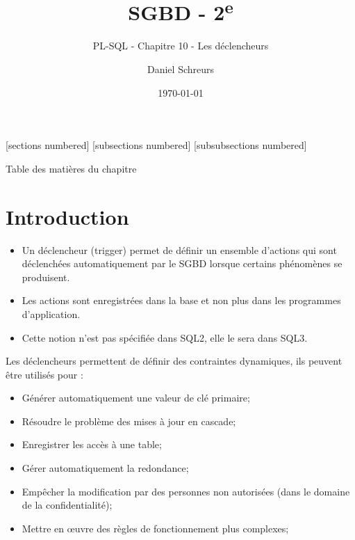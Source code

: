 \documentclass[10pt]{beamer}
\title{SGBD - 2\textsuperscript{e}}
\subtitle{PL-SQL - Chapitre 10 - Les déclencheurs}
\date{\today}
\author{Daniel Schreurs}
\institute{Haute École de la Province de Liège}
\begin{document}
\maketitle

[sections numbered]
[subsections numbered]
[subsubsections numbered]
\begin{frame}[allowframebreaks]{Table des matières du chapitre}
    \tableofcontents[subsectionstyle=show/show/hide,subsubsectionstyle=show/show/hide,]
\end{frame}

\section{Introduction}
\begin{frame}{\secname}
    \begin{itemize}
        \item Un déclencheur (trigger) permet de définir un ensemble d'actions qui sont déclenchées automatiquement par le SGBD lorsque certains phénomènes se produisent.
        \item Les actions sont enregistrées dans la base et non plus dans les programmes d'application.
        \item Cette notion n'est pas spécifiée dans SQL2, elle le sera dans SQL3.
    \end{itemize}
\end{frame}

\begin{frame}{\secname}
    Les déclencheurs permettent de définir des contraintes dynamiques, ils peuvent être utilisés pour :
    \begin{itemize}
        \item Générer automatiquement une valeur de clé primaire;
        \item Résoudre le problème des mises à jour en cascade;
        \item Enregistrer les accès à une table;
        \item Gérer automatiquement la redondance;
        \item Empêcher la modification par des personnes non autorisées (dans le domaine de la confidentialité);
        \item Mettre en œuvre des règles de fonctionnement plus complexes;
    \end{itemize}
\end{frame}
\end{document}
